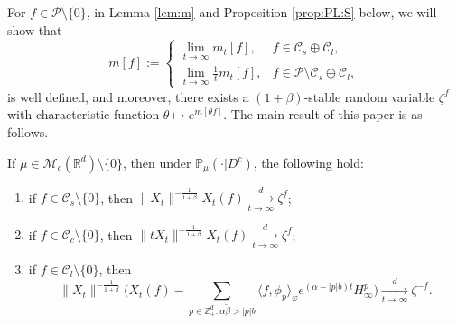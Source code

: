 \documentclass[EJP]{ejpecp} %
\begin{document}
	For $f\in \mathcal P\setminus \{0\}$, in Lemma \ref{lem:m} and Proposition \ref{prop:PL:S} below, we will show that
\begin{equation}
\label{eq:I:R:3}
	m[f]
	:= 
\begin{cases}
    \lim_{t\to \infty} m_t[f], &
    f \in \mathcal C_s \oplus \mathcal C_l, \\
    \lim_{t\to \infty} \frac{1}{t} m_t[f], & f\in \mathcal P \setminus \mathcal C_s \oplus \mathcal C_l,
\end{cases}
\end{equation}
	is well defined, and moreover, there exists a $(1+\beta)$-stable random variable $\zeta^f$ with characteristic function $\theta \mapsto e^{m[\theta f]}$.
	The main result of this paper is as follows.

\begin{theorem}
\label{thm:M}
	If $\mu\in \mathcal M_c(\mathbb R^d)\setminus \{0\}$, then under $\mathbb{P}_{\mu}(\cdot|D^c)$, the following hold:
\begin{enumerate}
\item \label{thm:M:1}
  	if $f\in \mathcal C_s\setminus\{0\}$, then $\|X_t\|^{- \frac{1}{1+\beta}} X_t(f)  \xrightarrow[t\to \infty]{d} \zeta^f$;
\item \label{thm:M:2}
  	if $f\in \mathcal C_c\setminus\{0\}$, then $ \|t X_t\|^{-\frac{1}{1+\beta}} X_t(f) \xrightarrow[t\to \infty]{d} \zeta^f$;
\item \label{thm:M:3}
  	if $f\in \mathcal C_l\setminus\{0\}$, then
\[
    \|X_t\|^{-\frac{1}{1+\beta}} \Big( X_t(f) - \sum_{p\in \mathbb Z^d_+:\alpha \tilde \beta>|p|b}\langle f,\phi_p\rangle_\varphi e^{(\alpha-|p|b)t}H^p_{\infty}\Big)
    \xrightarrow[t\to \infty]{d}
    \zeta^{-f}.
\]
\end{enumerate}
\end{theorem}
\end{document}

